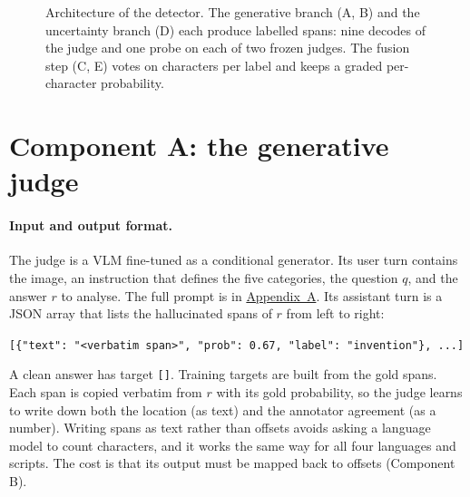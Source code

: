 \begin{figure}[!htb]
{%
}
\caption{Architecture of the detector. The generative branch (A, B) and the uncertainty branch (D) each produce labelled spans: nine decodes of the judge and one probe on each of two frozen judges. The fusion step (C, E) votes on characters per label and keeps a graded per-character probability.}
\label{fig:arch}
\end{figure}

\section{Component A: the generative judge}\label{sec:judge}

\paragraph{Input and output format.}
The judge is a VLM fine-tuned as a conditional generator. Its user turn contains the image, an instruction that defines the five categories, the question $q$, and the answer $r$ to analyse. The full prompt is in \hyperref[app:prompt]{Appendix~A}. Its assistant turn is a JSON array that lists the hallucinated spans of $r$ from left to right:
\begin{center}
\texttt{[\{"text": "<verbatim span>", "prob": 0.67, "label": "invention"\}, ...]}
\end{center}
A clean answer has target \texttt{[]}. Training targets are built from the gold spans. Each span is copied verbatim from $r$ with its gold probability, so the judge learns to write down both the location (as text) and the annotator agreement (as a number). Writing spans as text rather than offsets avoids asking a language model to count characters, and it works the same way for all four languages and scripts. The cost is that its output must be mapped back to offsets (Component B).

